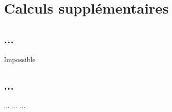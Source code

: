 
\chapter{Calculs supplémentaires} %

\label{AppendixA} %

\section{...}

Impossible

\section{...}

... ... ...
